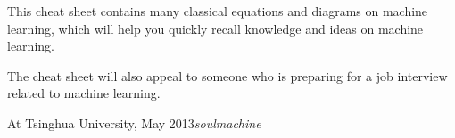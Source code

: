 %
%

\preface

This cheat sheet contains many classical equations and diagrams on machine learning, which will help you quickly recall knowledge and ideas on machine learning.

The cheat sheet will also appeal to someone who is preparing for a job interview related to machine learning. 

\vspace{\baselineskip}
\begin{flushright}\noindent
At Tsinghua University, May 2013\hfill {\it soulmachine} \\
\end{flushright}


